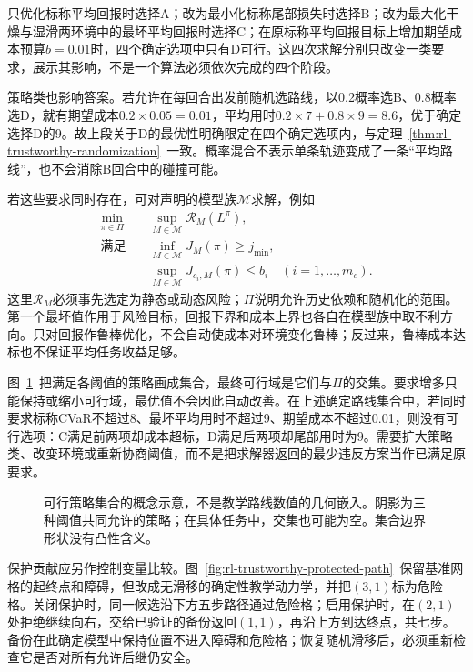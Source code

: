 只优化标称平均回报时选择A；改为最小化标称尾部损失时选择B；改为最大化干燥与湿滑两环境中的最坏平均回报时选择C；在原标称平均回报目标上增加期望成本预算$b=0.01$时，四个确定选项中只有D可行。这四次求解分别只改变一类要求，展示其影响，不是一个算法必须依次完成的四个阶段。

策略类也影响答案。若允许在每回合出发前随机选路线，以0.2概率选B、0.8概率选D，就有期望成本$0.2\times0.05=0.01$，平均用时$0.2\times7+0.8\times9=8.6$，优于确定选择D的9。故上段关于D的最优性明确限定在四个确定选项内，与定理~\ref{thm:rl-trustworthy-randomization}~一致。概率混合不表示单条轨迹变成了一条“平均路线”，也不会消除B回合中的碰撞可能。

若这些要求同时存在，可对声明的模型族$\mathcal M$求解，例如
\begin{align}
  \min_{\pi\in\Pi}\quad&
      \sup_{M\in\mathcal M}\mathcal R_M(L^\pi), \nonumber\\
  \text{满足}\quad&
      \inf_{M\in\mathcal M}J_M(\pi)\geq j_{\min}, \nonumber\\
  &\sup_{M\in\mathcal M}J_{c_i,M}(\pi)\leq b_i
       \quad (i=1,\ldots,m_c).
  \label{eq:rl-trustworthy-combined-problem}
\end{align}
这里$\mathcal R_M$必须事先选定为静态或动态风险；$\Pi$说明允许历史依赖和随机化的范围。第一个最坏值作用于风险目标，回报下界和成本上界也各自在模型族中取不利方向。只对回报作鲁棒优化，不会自动使成本对环境变化鲁棒；反过来，鲁棒成本达标也不保证平均任务收益足够。

图~\ref{fig:rl-trustworthy-intersection}~把满足各阈值的策略画成集合，最终可行域是它们与$\Pi$的交集。要求增多只能保持或缩小可行域，最优值不会因此自动改善。在上述确定路线集合中，若同时要求标称CVaR不超过8、最坏平均用时不超过9、期望成本不超过0.01，则没有可行选项：C满足前两项却成本超标，D满足后两项却尾部用时为9。需要扩大策略类、改变环境或重新协商阈值，而不是把求解器返回的最少违反方案当作已满足原要求。

\begin{figure}[htbp]
  \centering
  
  \caption{可行策略集合的概念示意，不是教学路线数值的几何嵌入。阴影为三种阈值共同允许的策略；在具体任务中，交集也可能为空。集合边界形状没有凸性含义。}
  \label{fig:rl-trustworthy-intersection}
\end{figure}

保护贡献应另作控制变量比较。图~\ref{fig:rl-trustworthy-protected-path}~保留基准网格的起终点和障碍，但改成无滑移的确定性教学动力学，并把$(3,1)$标为危险格。关闭保护时，同一候选沿下方五步路径通过危险格；启用保护时，在$(2,1)$处拒绝继续向右，交给已验证的备份返回$(1,1)$，再沿上方到达终点，共七步。备份在此确定模型中保持位置不进入障碍和危险格；恢复随机滑移后，必须重新检查它是否对所有允许后继仍安全。

